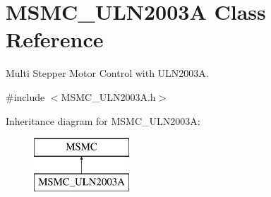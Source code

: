 \hypertarget{class_m_s_m_c___u_l_n2003_a}{\section{M\+S\+M\+C\+\_\+\+U\+L\+N2003\+A Class Reference}
\label{class_m_s_m_c___u_l_n2003_a}
}


Multi Stepper Motor Control with U\+L\+N2003\+A.  




{\ttfamily \#include $<$M\+S\+M\+C\+\_\+\+U\+L\+N2003\+A.\+h$>$}

Inheritance diagram for M\+S\+M\+C\+\_\+\+U\+L\+N2003\+A\+:\begin{figure}[H]
\begin{center}
\leavevmode
\includegraphics[height=2.000000cm]{class_m_s_m_c___u_l_n2003_a}
\end{center}
\end{figure}
